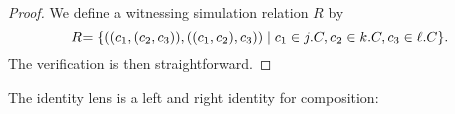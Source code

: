 \begin{defn}[$R$-similarity]
\begin{theorem}
\iffull
\begin{proof}
We define a witnessing simulation relation $R$ by
\[
\mathrel{R_{}} = \{((c_1,(c_2,c_3)), ((c_1,c_2),c_3))\mid  c_1\in j.C, c_2\in k.C, c_3\in \ell.C\}.
\]
The verification is then straightforward. 

\end{proof}
\fi

\begin{lemma}
\iftext The identity lens is a left and right identity for composition: \fi
{}
\end{lemma}


\end{theorem}
\end{defn}
